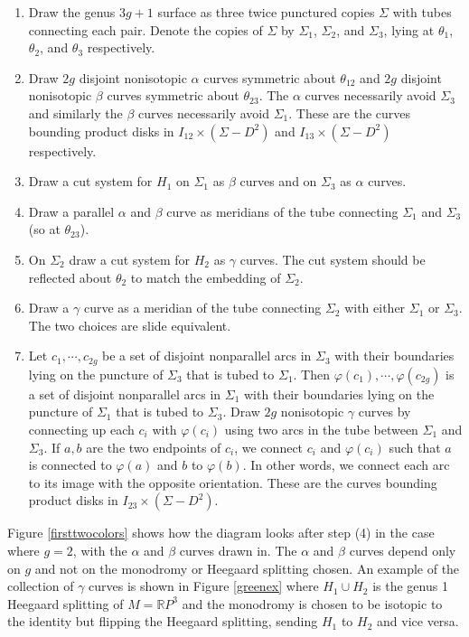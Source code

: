 \documentclass[12pt]{amsart}
\newcommand{\R}{\mathbb{R}}
\theoremstyle{definition}
\theoremstyle{remark}
\begin{document}
\begin{enumerate}
\item Draw the genus $3g+1$ surface as three twice punctured copies $\Sigma$ with tubes connecting each pair.
Denote the copies of $\Sigma$ by $\Sigma_1$, $\Sigma_2$, and $\Sigma_3$, lying at $\theta_1$, $\theta_2$, and $\theta_3$ respectively.
\item Draw $2g$ disjoint nonisotopic $\alpha$ curves symmetric about $\theta_{12}$ and $2g$ disjoint nonisotopic $\beta$ curves symmetric about $\theta_{23}$.
The $\alpha$ curves necessarily avoid $\Sigma_3$ and similarly the $\beta$ curves necessarily avoid $\Sigma_1$.
These are the curves bounding product disks in $I_{12} \times (\Sigma - D^2)$ and $I_{13} \times (\Sigma - D^2)$ respectively.
\item Draw a cut system for $H_1$ on $\Sigma_1$ as $\beta$ curves and on $\Sigma_3$ as $\alpha$ curves.
\item Draw a parallel $\alpha$ and $\beta$ curve as meridians of the tube connecting  $\Sigma_1$ and $\Sigma_3$ (so at $\theta_{23}$).

\item On $\Sigma_2$ draw a cut system for $H_2$ as $\gamma$ curves.
The cut system should be reflected about $\theta_2$ to match the embedding of $\Sigma_2$.
\item Draw a $\gamma$ curve as a meridian of the tube connecting $\Sigma_2$ with either $\Sigma_1$ or $\Sigma_3$.
The two choices are slide equivalent.
\item Let $c_1,\cdots,c_{2g}$ be a set of disjoint nonparallel arcs in $\Sigma_3$ with their boundaries lying on the puncture of $\Sigma_3$ that is tubed to $\Sigma_1$.
Then $\varphi(c_1),\cdots,\varphi(c_{2g})$ is a set of disjoint nonparallel arcs in $\Sigma_1$ with their boundaries lying on the puncture of $\Sigma_1$ that is tubed to $\Sigma_3$.
Draw $2g$ nonisotopic $\gamma$ curves by connecting up each $c_i$ with $\varphi(c_i)$ using two arcs in the tube between $\Sigma_1$ and $\Sigma_3$.
If $a,b$ are the two endpoints of $c_i$, we connect $c_i$ and $\varphi(c_i)$ such that $a$ is connected to $\varphi(a)$ and $b$ to $\varphi(b)$.
In other words, we connect each arc to its image with the opposite orientation.
These are the curves bounding product disks in $I_{23} \times (\Sigma - D^2)$.
\end{enumerate}

Figure \ref{firsttwocolors} shows how the diagram looks after step (4) in the case where $g=2$, with the $\alpha$ and $\beta$ curves drawn in.
The $\alpha$ and $\beta$ curves depend only on $g$ and not on the monodromy or Heegaard splitting chosen.
An example of the collection of $\gamma$ curves is shown in Figure \ref{greenex} where $H_1 \cup H_2$ is the genus 1 Heegaard splitting of $M = \R P^3$ and the monodromy is chosen to be isotopic to the identity but flipping the Heegaard splitting, sending $H_1$ to $H_2$ and vice versa.
\end{document}

